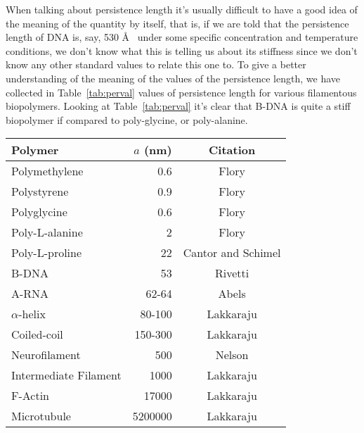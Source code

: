 When talking about persistence length it's usually difficult to have a
good idea of the meaning of the quantity by itself, that is, if we are
told that the  persistence length of DNA is, say,  530 \AA~ under some
specific concentration and temperature  conditions, we don't know what
this is telling  us about its stiffness since we  don't know any other
standard values to relate this  one to. To give a better understanding
of  the meaning  of  the values  of  the persistence  length, we  have
collected in  Table~\ref{tab:perval} values of  persistence length for
various  filamentous biopolymers.   Looking  at Table~\ref{tab:perval}
it's  clear that  B-DNA is  quite a  stiff biopolymer  if  compared to
poly-glycine, or poly-alanine.

\begin{table}[htbp]
\begin{center}
\begin{threeparttable}
\begin{tabular}{l|r|c}
\hline
Polymer               & $a$ (nm) & Citation  \\ \hline
Polymethylene         & 0.6      & Flory\tnote{a}      \\  
Polystyrene           & 0.9      & Flory\tnote{a}      \\
Polyglycine           & 0.6      & Flory \tnote{b}     \\
Poly-L-alanine        & 2        & Flory \tnote{b}     \\
Poly-L-proline        & 22       & Cantor and Schimel \cite{cantor1980} \\
B-DNA                 & 53       & Rivetti \cite{rivetti1996}     \\
A-RNA                 & 62-64    & Abels     \cite{abels2005}     \\
$\alpha$-helix        & 80-100   & Lakkaraju \cite{lakkaraju2009} \\
Coiled-coil           & 150-300  & Lakkaraju \cite{lakkaraju2009} \\
Neurofilament         & 500      & Nelson    \cite{nelson2004}    \\
Intermediate Filament & 1000     & Lakkaraju \cite{lakkaraju2009} \\
F-Actin               & 17000    & Lakkaraju \cite{lakkaraju2009} \\
Microtubule           & 5200000  & Lakkaraju \cite{lakkaraju2009} \\

\end{tabular}
\end{threeparttable}
\end{center}
\end{table}
